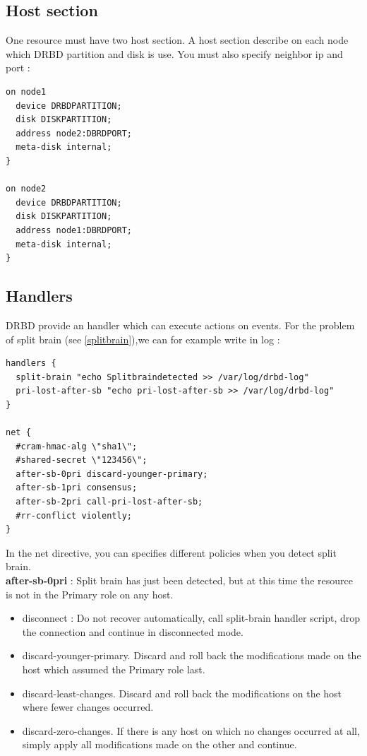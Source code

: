 \documentclass[a4paper,10pt]{report}
\begin{document}
\subsection{Host section}
\label{hostsection} 
One resource must have two host section. A host section describe on each node which DRBD partition and disk is use. You must also specify neighbor ip and port :
\begin{lstlisting}
on node1 
  device DRBDPARTITION;
  disk DISKPARTITION;
  address node2:DBRDPORT;
  meta-disk internal;
}

on node2 
  device DRBDPARTITION;
  disk DISKPARTITION;
  address node1:DBRDPORT;
  meta-disk internal;
}
\end{lstlisting}

\subsection{Handlers}
DRBD provide an handler which can execute actions on events. For the problem of split brain (see \ref{splitbrain}),we can for example write in log :
\begin{lstlisting}
handlers {
  split-brain "echo Splitbraindetected >> /var/log/drbd-log"
  pri-lost-after-sb "echo pri-lost-after-sb >> /var/log/drbd-log"
}

net {
  #cram-hmac-alg \"sha1\";
  #shared-secret \"123456\";
  after-sb-0pri discard-younger-primary;
  after-sb-1pri consensus;
  after-sb-2pri call-pri-lost-after-sb;
  #rr-conflict violently;
}
\end{lstlisting}
In the net directive, you can specifies different policies when you detect split brain.\\
\textbf{after-sb-0pri} : Split brain has just been detected, but at this time the resource is not in the Primary role on any host.
\begin{itemize}
\item disconnect : Do not recover automatically, call split-brain handler script, drop the connection and continue in disconnected mode.
\item discard-younger-primary. Discard and roll back the modifications made on the host which assumed the Primary role last.
\item discard-least-changes. Discard and roll back the modifications on the host where fewer changes occurred.
\item discard-zero-changes. If there is any host on which no changes occurred at all, simply apply all modifications made on the other and continue.
\end{itemize}
\end{document}
